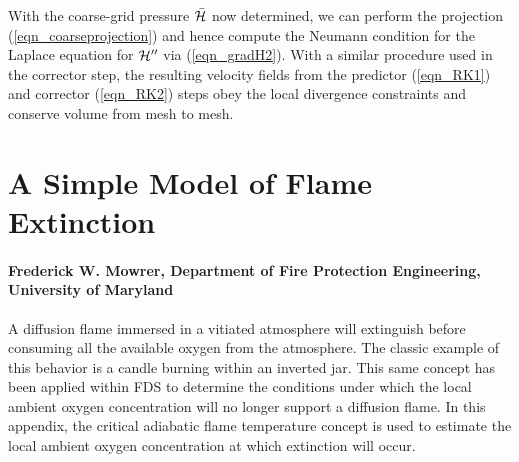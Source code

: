 \documentclass[11pt]{book}
\begin{document}
With the coarse-grid pressure $\bar{{\cal H}}$ now determined, we can perform the projection (\ref{eqn_coarseprojection}) and hence compute the Neumann condition for the Laplace equation for ${\cal H}''$ via (\ref{eqn_gradH2}).  With a similar procedure used in the corrector step, the resulting velocity fields from the predictor (\ref{eqn_RK1}) and corrector (\ref{eqn_RK2}) steps obey the local divergence constraints and conserve volume from mesh to mesh.


\chapter{A Simple Model of Flame Extinction}

\subsubsection{Frederick W. Mowrer, Department of Fire Protection Engineering, University of Maryland}

\label{mowrer_model}


A diffusion flame immersed in a vitiated atmosphere will extinguish before consuming all the
available oxygen from the atmosphere.  The classic example of this behavior is a candle burning
within an inverted jar.  This same concept has been applied within FDS
to determine the conditions under which the local ambient oxygen concentration will no longer
support a diffusion flame.  In this appendix, the critical adiabatic flame temperature
concept is used to estimate the local ambient oxygen concentration at which extinction will
occur.
\end{document}

